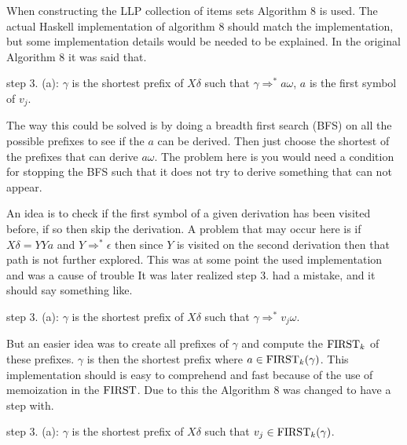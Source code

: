 When constructing the LLP collection of items sets Algorithm 8 \cite[13]{Vagner2007} is used. The actual Haskell implementation of algorithm 8 should match the implementation, but some implementation details would be needed to be explained. In the original Algorithm 8 it was said that. 
\begin{center}
    step 3. (a): $\gamma$ is the shortest prefix of $X\delta$ such that $\gamma \Rightarrow^* a\omega$, $a$ is the first symbol of $v_j$. 
\end{center}
The way this could be solved is by doing a breadth first search (BFS) on all the possible prefixes to see if the $a$ can be derived. Then just choose the shortest of the prefixes that can derive $a\omega$.  The problem here is you would need a condition for stopping the BFS such that it does not try to derive something that can not appear.

An idea is to check if the first symbol of a given derivation has been visited before, if so then skip the derivation. A problem that may occur here is if $X\delta = YYa$ and $Y \Rightarrow^* \epsilon$ then since $Y$ is visited on the second derivation then that path is not further explored. This was at some point the used implementation and was a cause of trouble It was later realized step 3. had a mistake, and it should say something like.
\begin{center}
    step 3. (a): $\gamma$ is the shortest prefix of $X\delta$ such that $\gamma \Rightarrow^* v_j\omega$. 
\end{center}
But an easier idea was to create all prefixes of $\gamma$ and compute the $\text{FIRST}_k$ of these prefixes. $\gamma$ is then the shortest prefix where $a \in \text{FIRST}_k(\gamma)$. This implementation should is easy to comprehend and fast because of the use of memoization in the $\text{FIRST}$. Due to this the Algorithm 8 was changed to have a step with.
\begin{center}
    step 3. (a): $\gamma$ is the shortest prefix of $X\delta$ such that $v_j \in \text{FIRST}_k(\gamma)$. 
\end{center}